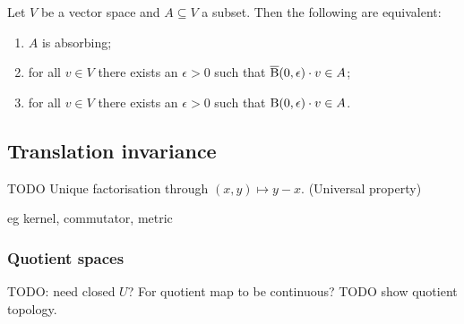 \begin{lemma}
Let $V$ be a vector space and $A\subseteq V$ a subset. Then the following are equivalent:
\begin{enumerate}
\item $A$ is absorbing;
\item for all $v\in V$ there exists an $\epsilon>0$ such that $\operatorname{\overline{B}}(0,\epsilon)\cdot v\in A$;
\item for all $v\in V$ there exists an $\epsilon>0$ such that $\operatorname{B}(0,\epsilon)\cdot v\in A$.
\end{enumerate}
\end{lemma}

\subsection{Translation invariance}
TODO Unique factorisation through $(x,y)\mapsto y-x$. (Universal property)

eg kernel, commutator, metric

\subsubsection{Quotient spaces}
TODO: need closed $U$? For quotient map to be continuous? TODO show quotient topology.

